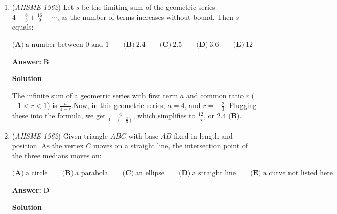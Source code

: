 \begin{enumerate}
 \[R=c\cdot\frac{S}T\]

 for some constant $c$. 

 You know that

 
 \[\frac43=c\cdot\frac{3/7}{9/14}=c\cdot\frac37\cdot\frac{14}9=c\cdot\frac23\,,\]

 so

 
 \[c=\frac{4/3}{2/3}=2\,.\]

 When $R=\sqrt{48}$ and $T=\sqrt{75}$ we have

 
 \[\sqrt{48}=\frac{2S}{\sqrt{75}}\,,\]

 so

 
 \[S=\frac12\sqrt{48\cdot75}=30\,.\] $\boxed{B}$
\begin{verbatim}
-- zixuan 12
\end{verbatim}




	\item (\textit{AHSME 1962}) Let $s$ be the limiting sum of the geometric series $4 - \frac{8}{3} + \frac{16}{9} - \cdots$, as the number of terms increases without bound. Then $s$ equals:


 $\textbf{(A)}\ \text{a number between } 0 \text{ and } 1 \qquad  \textbf{(B)}\ 2.4 \qquad  \textbf{(C)}\ 2.5 \qquad  \textbf{(D)}\ 3.6 \qquad  \textbf{(E)}\ 12$

 \textbf{Answer: }B



\textbf{Solution}

The infinite sum of a geometric series with first term $a$ and common ratio $r$ ($-1<r<1$) is $\frac{a}{1-r}$.Now, in this geometric series, $a=4$, and $r=-\frac23$. Plugging these into the formula, we get $\frac4{1-(-\frac23)}$, which simplifies to $\frac{12}5$, or $\boxed{2.4\textbf{ (B)}}$.

 


	\item (\textit{AHSME 1962}) Given triangle $ABC$ with base $AB$ fixed in length and position. As the vertex $C$ moves on a straight line, the intersection point of the three medians moves on:


 $\textbf{(A)}\ \text{a circle} \qquad  \textbf{(B)}\ \text{a parabola} \qquad  \textbf{(C)}\ \text{an ellipse} \qquad  \textbf{(D)}\ \text{a straight line} \qquad  \textbf{(E)}\ \text{a curve not listed here}$

 \textbf{Answer: }D



\textbf{Solution}


\end{enumerate}

